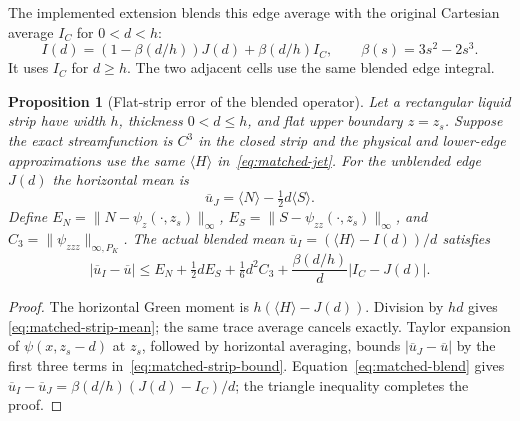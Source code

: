 \documentclass[10pt]{article}
\newtheorem{proposition}{Proposition}
\begin{document}
The implemented extension blends this edge average with the original
Cartesian average $I_C$ for $0<d<h$:
\begin{equation}
 I(d)=(1-\beta(d/h))J(d)+\beta(d/h)I_C,
 \qquad \beta(s)=3s^2-2s^3.
 \label{eq:matched-blend}
\end{equation}
It uses $I_C$ for $d\ge h$. The two adjacent cells use the same blended
edge integral.

\begin{samepage}
\begin{proposition}[Flat-strip error of the blended operator]
Let a rectangular liquid strip have width $h$, thickness $0<d\le h$,
and flat upper boundary $z=z_s$. Suppose the exact streamfunction is
$C^3$ in the closed strip and the physical and lower-edge approximations
use the same $\langle H\rangle$ in~\eqref{eq:matched-jet}.
For the unblended edge $J(d)$ the horizontal mean is
\begin{equation}
 \overline u_J=\langle N\rangle-\tfrac12d\langle S\rangle.
 \label{eq:matched-strip-mean}
\end{equation}
Define
$E_N=\|N-\psi_z(\cdot,z_s)\|_{\infty}$,
$E_S=\|S-\psi_{zz}(\cdot,z_s)\|_{\infty}$, and
$C_3=\|\psi_{zzz}\|_{\infty,P_K}$. The actual blended mean
$\overline u_I=(\langle H\rangle-I(d))/d$ satisfies
\begin{equation}
 |\overline u_I-\overline u|
 \le E_N+\tfrac12d E_S+\tfrac16d^2 C_3
 +\frac{\beta(d/h)}{d}|I_C-J(d)|.
 \label{eq:matched-strip-bound}
\end{equation}
\end{proposition}
\begin{proof}
The horizontal Green moment is
$h(\langle H\rangle-J(d))$. Division by $hd$ gives
\eqref{eq:matched-strip-mean}; the same trace average cancels exactly.
Taylor expansion of $\psi(x,z_s-d)$ at $z_s$, followed by horizontal
averaging, bounds $|\overline u_J-\overline u|$ by the first three terms
in~\eqref{eq:matched-strip-bound}. Equation~\eqref{eq:matched-blend} gives
$\overline u_I-\overline u_J=\beta(d/h)(J(d)-I_C)/d$; the triangle
inequality completes the proof.
\end{proof}
\end{samepage}
\end{document}
